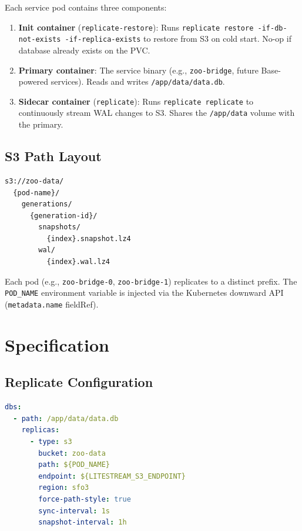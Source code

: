 \documentclass[twocolumn,11pt]{article}
\begin{document}
Each service pod contains three components:

\begin{enumerate}
\item \textbf{Init container} (\texttt{replicate-restore}): Runs
  \texttt{replicate restore -if-db-not-exists -if-replica-exists}
  to restore from S3 on cold start.  No-op if database already
  exists on the PVC.

\item \textbf{Primary container}: The service binary (e.g.,
  \texttt{zoo-bridge}, future Base-powered services).  Reads and
  writes \texttt{/app/data/data.db}.

\item \textbf{Sidecar container} (\texttt{replicate}): Runs
  \texttt{replicate replicate} to continuously stream WAL changes
  to S3.  Shares the \texttt{/app/data} volume with the primary.
\end{enumerate}

\subsection{S3 Path Layout}

\begin{verbatim}
s3://zoo-data/
  {pod-name}/
    generations/
      {generation-id}/
        snapshots/
          {index}.snapshot.lz4
        wal/
          {index}.wal.lz4
\end{verbatim}

Each pod (e.g., \texttt{zoo-bridge-0}, \texttt{zoo-bridge-1})
replicates to a distinct prefix.  The \texttt{POD\_NAME}
environment variable is injected via the Kubernetes downward API
(\texttt{metadata.name} fieldRef).

\section{Specification}

\subsection{Replicate Configuration}

\begin{lstlisting}[language=yaml,caption={replicate-config ConfigMap}]
dbs:
  - path: /app/data/data.db
    replicas:
      - type: s3
        bucket: zoo-data
        path: ${POD_NAME}
        endpoint: ${LITESTREAM_S3_ENDPOINT}
        region: sfo3
        force-path-style: true
        sync-interval: 1s
        snapshot-interval: 1h
\end{lstlisting}
\end{document}
